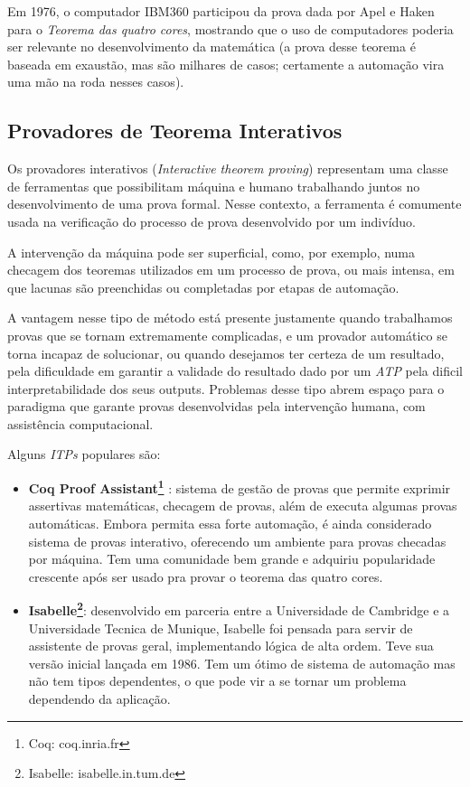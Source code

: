 Em 1976, o computador IBM360 participou da prova dada por Apel e Haken para o \textit{Teorema das quatro cores}, mostrando que o uso de computadores poderia ser relevante no desenvolvimento da matemática (a prova desse teorema é baseada em exaustão, mas são milhares de casos; certamente a automação vira uma mão na roda nesses casos).

\subsection{Provadores de Teorema Interativos}

Os provadores interativos (\textit{Interactive theorem proving}) representam uma classe de ferramentas que possibilitam máquina e humano trabalhando juntos no desenvolvimento de uma prova formal.
Nesse contexto, a ferramenta é comumente usada na verificação do processo de prova desenvolvido por um indivíduo.

A intervenção da máquina pode ser superficial, como, por exemplo, numa checagem dos teoremas utilizados em um processo de prova, ou mais intensa, em que lacunas são preenchidas ou completadas por etapas de automação.

A vantagem nesse tipo de método está presente justamente quando trabalhamos provas que se tornam extremamente complicadas, e um provador automático se torna incapaz de solucionar, ou quando desejamos ter certeza de um resultado, pela dificuldade em garantir a validade do resultado dado por um \textit{ATP} pela dificil interpretabilidade dos seus outputs.
Problemas desse tipo abrem espaço para o paradigma que garante provas desenvolvidas pela intervenção humana, com assistência computacional.

Alguns \textit{ITPs} populares são:
\begin{itemize}
    \item \textbf{Coq Proof Assistant\footnote{Coq: coq.inria.fr}} : sistema de gestão de provas que permite exprimir assertivas matemáticas, checagem de provas, além de executa algumas provas automáticas. Embora permita essa forte automação, é ainda considerado sistema de provas interativo, oferecendo um ambiente para provas checadas por máquina. Tem uma comunidade bem grande e adquiriu popularidade crescente após ser usado pra provar o teorema das quatro cores.

    \item \textbf{Isabelle\footnote{Isabelle: isabelle.in.tum.de}}: desenvolvido em parceria entre a Universidade de Cambridge e a Universidade Tecnica de Munique, Isabelle foi pensada para servir de assistente de provas geral, implementando lógica de alta ordem. Teve sua versão inicial lançada em 1986. Tem um ótimo de sistema de automação mas não tem tipos dependentes, o que pode vir a se tornar um problema dependendo da aplicação.
\end{itemize}

